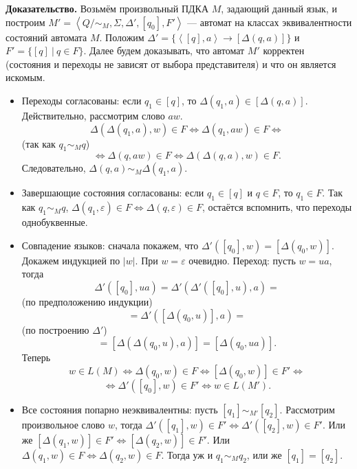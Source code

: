 \textbf{Доказательство.} Возьмём произвольный ПДКА $M$, задающий данный язык, и построим $M' = \left<Q / \sim_M, \Sigma, \Delta', [q_0], F' \right>$ --- автомат на классах эквивалентности состояний автомата $M$.
Положим $\Delta' = \{\left<[q], a \right> \to [\Delta(q, a)]\}$ и $F' = \{[q]~|~q \in F\}$.
Далее будем доказывать, что автомат $M'$ корректен (состояния и переходы не зависят от выбора представителя) и что он является искомым.
\begin{itemize}
    \item Переходы согласованы: если $q_1 \in [q]$, то $\Delta(q_1, a) \in [\Delta(q, a)]$.
        Действительно, рассмотрим слово $aw$.
        \[
            \Delta(\Delta(q_1, a), w) \in F \iff \Delta(q_1, aw) \in F \iff 
        \]
        (так как $q_1 \sim_M q$)
        \[
            \iff \Delta(q, aw) \in F \iff \Delta(\Delta(q, a), w) \in F.
        \]
        Следовательно, $\Delta(q, a) \sim_M \Delta(q_1, a)$.

    \item Завершающие состояния согласованы: если $q_1 \in [q]$ и $q \in F$, то $q_1 \in F$.
        Так как $q_1 \sim_M q$, $\Delta(q_1, \varepsilon) \in F \iff \Delta(q, \varepsilon) \in F$, остаётся вспомнить, что переходы однобуквенные.

    \item Совпадение языков: сначала покажем, что $\Delta'([q_0], w) = [\Delta(q_0, w)]$.
        Докажем индукцией по $|w|$. При $w = \varepsilon$ очевидно.
        Переход: пусть $w = ua$, тогда 
        \[
            \Delta'([q_0], ua) = \Delta'(\Delta'([q_0], u), a) =
        \]
        (по предположению индукции)
        \[
            = \Delta'([\Delta(q_0, u)], a) =
        \]
        (по построению $\Delta'$)
        \[
            = [\Delta(\Delta(q_0, u), a)] = [\Delta(q_0, ua)].
        \]
        Теперь
        \[
            w \in L(M) \iff \Delta(q_0, w) \in F \iff [\Delta(q_0, w)] \in F' \iff
        \]
        \[
            \iff \Delta'([q_0], w) \in F' \iff w \in L(M').
        \]

    \item Все состояния попарно неэквивалентны: пусть $[q_1] \sim_{M'} [q_2]$.
        Рассмотрим произвольное слово $w$, тогда $\Delta'([q_1], w) \in F' \iff \Delta'([q_2], w) \in F'$.
        Или же $[\Delta(q_1, w)] \in F' \iff [\Delta(q_2, w)] \in F'$.
        Или $\Delta(q_1, w) \in F \iff \Delta(q_2, w) \in F$.
        Тогда уж и $q_1 \sim_M q_2$, или же $[q_1] = [q_2]$.
\end{itemize}

